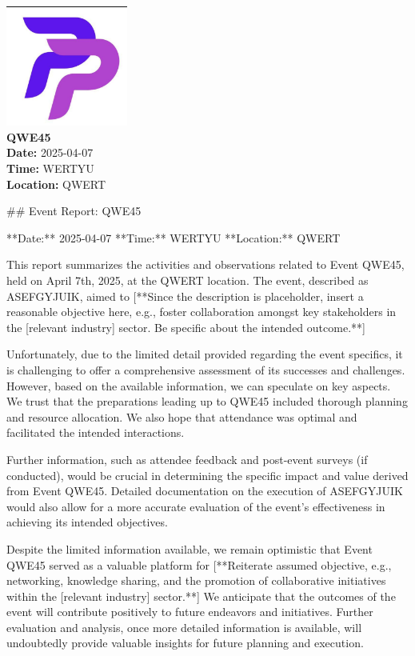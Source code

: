 \documentclass{article}
\begin{document}
\begin{center}
    \includegraphics[width=0.3\textwidth]{logo.png}\\[0.5cm]
    {\LARGE \textbf{QWE45}}\\[0.3cm]
    \normalsize
    \textbf{Date:} 2025-04-07 \\
    \textbf{Time:} WERTYU \\
    \textbf{Location:} QWERT
\end{center}

\vspace{1cm}

\#\# Event Report: QWE45

**Date:** 2025-04-07
**Time:** WERTYU
**Location:** QWERT

This report summarizes the activities and observations related to Event QWE45, held on April 7th, 2025, at the QWERT location. The event, described as ASEFGYJUIK, aimed to [**Since the description is placeholder, insert a reasonable objective here, e.g., foster collaboration amongst key stakeholders in the [relevant industry] sector. Be specific about the intended outcome.**]

Unfortunately, due to the limited detail provided regarding the event specifics, it is challenging to offer a comprehensive assessment of its successes and challenges. However, based on the available information, we can speculate on key aspects. We trust that the preparations leading up to QWE45 included thorough planning and resource allocation. We also hope that attendance was optimal and facilitated the intended interactions.

Further information, such as attendee feedback and post-event surveys (if conducted), would be crucial in determining the specific impact and value derived from Event QWE45. Detailed documentation on the execution of ASEFGYJUIK would also allow for a more accurate evaluation of the event's effectiveness in achieving its intended objectives.

Despite the limited information available, we remain optimistic that Event QWE45 served as a valuable platform for [**Reiterate assumed objective, e.g., networking, knowledge sharing, and the promotion of collaborative initiatives within the [relevant industry] sector.**] We anticipate that the outcomes of the event will contribute positively to future endeavors and initiatives. Further evaluation and analysis, once more detailed information is available, will undoubtedly provide valuable insights for future planning and execution.
\end{document}
